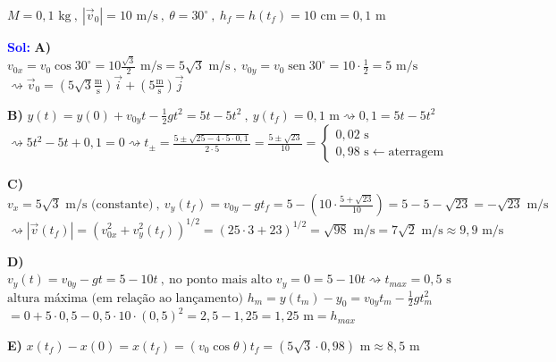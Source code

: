 \documentclass{beamer}
\begin{document}
	\begin{frame}{}
		\scriptsize
		
		$M = 0,1 \text{ kg} \ , \ |\vec{v}_0| = 10 \text{ m/s} \ , \ \theta = 30^\circ \ , \ h_f = h(t_f) = 10 \text{ cm} = 0,1 \text{ m}$
		
		\vspace{0.2cm}
		\textcolor{blue}{\textbf{Sol:}} \quad \textbf{A)} $v_{0x} = v_0 \cos 30^\circ = 10 \frac{\sqrt{3}}{2} \text{ m/s} = 5\sqrt{3} \text{ m/s} \ , \ v_{0y} = v_0 \operatorname{sen} 30^\circ = 10 \cdot \frac{1}{2} = 5 \text{ m/s}$ \\
		\vspace{0.05cm}
		\quad $\rightsquigarrow \vec{v}_0 = \left(5\sqrt{3} \frac{\text{m}}{\text{s}}\right)\vec{i} + \left(5 \frac{\text{m}}{\text{s}}\right)\vec{j}$
		
		\vspace{0.2cm}
		\textbf{B)} $y(t) = y(0) + v_{0y}t - \frac{1}{2}gt^2 = 5t - 5t^2 \ , \ y(t_f) = 0,1 \text{ m} \rightsquigarrow 0,1 = 5t - 5t^2$ \\
		\vspace{0.05cm}
		\quad $\rightsquigarrow 5t^2 - 5t + 0,1 = 0 \rightsquigarrow t_{\pm} = \frac{5 \pm \sqrt{25 - 4\cdot 5 \cdot 0,1}}{2 \cdot 5} = \frac{5 \pm \sqrt{23}}{10} = 
		\begin{cases} 
			0,02 \text{ s} \\ 
			0,98 \text{ s} \leftarrow \text{aterragem} 
		\end{cases}$
		
		\vspace{0.2cm}
		\textbf{C)} $v_x = 5\sqrt{3} \text{ m/s (constante)} \ , \ v_y(t_f) = v_{0y} - gt_f = 5 - \left(10 \cdot \frac{5+\sqrt{23}}{10}\right) = 5 - 5 - \sqrt{23} = -\sqrt{23} \text{ m/s}$ \\
		\vspace{0.05cm}
		\quad $\rightsquigarrow |\vec{v}(t_f)| = \left(v_{0x}^2 + v_y^2(t_f)\right)^{1/2} = (25\cdot 3 + 23)^{1/2} = \sqrt{98} \text{ m/s} = 7\sqrt{2} \text{ m/s} \approx 9,9 \text{ m/s}$
		
		\vspace{0.4cm}
		\textbf{D)} $v_y(t) = v_{0y} - gt = 5 - 10t \ , \ \text{no ponto mais alto } v_y = 0 = 5 - 10t \rightsquigarrow t_{max} = 0,5 \text{ s}$ \\
		\vspace{0.05cm}
		\quad $\text{altura máxima (em relação ao lançamento) } h_m = y(t_m) - y_0 = v_{0y}t_m - \frac{1}{2}gt_m^2$ \\
		\quad $= 0 + 5 \cdot 0,5 - 0,5 \cdot 10 \cdot (0,5)^2 = 2,5 - 1,25 = 1,25 \text{ m} = h_{max}$
		
		\vspace{0.4cm}
		\textbf{E)} $x(t_f) - x(0) = x(t_f) = (v_0 \cos\theta)t_f = (5\sqrt{3} \cdot 0,98) \text{ m} \approx 8,5 \text{ m}$
		
	\end{frame}
	
\end{document}
